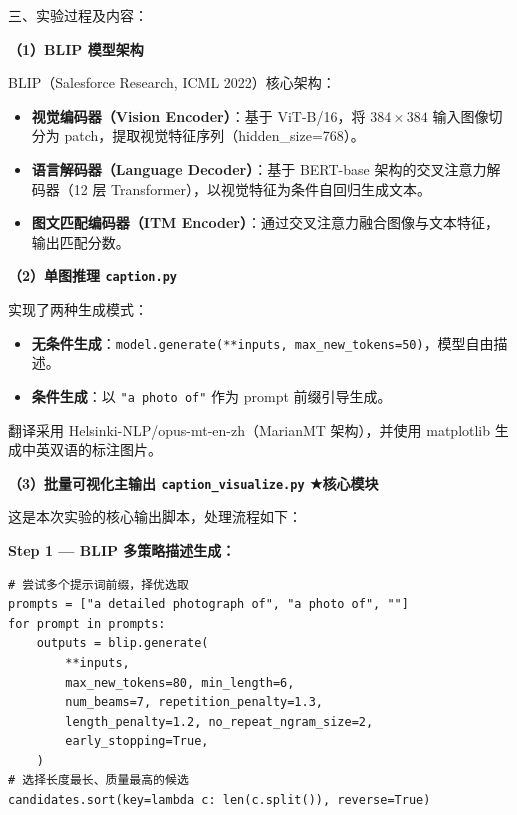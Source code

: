 \documentclass[12pt, a4paper]{article}
\begin{document}
\begin{labbox}{三、实验过程及内容：}{}

\textbf{（1）BLIP 模型架构}

BLIP（Salesforce Research, ICML 2022）核心架构：

\begin{itemize}[leftmargin=2em, itemsep=0.2em]
    \item \textbf{视觉编码器（Vision Encoder）}：基于 ViT-B/16，将 $384\times384$ 输入图像切分为 patch，提取视觉特征序列（hidden\_size=768）。
    \item \textbf{语言解码器（Language Decoder）}：基于 BERT-base 架构的交叉注意力解码器（12 层 Transformer），以视觉特征为条件自回归生成文本。
    \item \textbf{图文匹配编码器（ITM Encoder）}：通过交叉注意力融合图像与文本特征，输出匹配分数。
\end{itemize}

\vspace{0.3cm}
\textbf{（2）单图推理 \texttt{caption.py}}

实现了两种生成模式：

\begin{itemize}[leftmargin=2em, itemsep=0.2em]
    \item \textbf{无条件生成}：\texttt{model.generate(**inputs, max\_new\_tokens=50)}，模型自由描述。
    \item \textbf{条件生成}：以 \texttt{"a photo of"} 作为 prompt 前缀引导生成。
\end{itemize}

翻译采用 Helsinki-NLP/opus-mt-en-zh（MarianMT 架构），并使用 matplotlib 生成中英双语的标注图片。

\vspace{0.3cm}
\textbf{（3）批量可视化主输出 \texttt{caption\_visualize.py} ★核心模块}

这是本次实验的核心输出脚本，处理流程如下：

\noindent \textbf{Step 1 — BLIP 多策略描述生成：}

\begin{lstlisting}
# 尝试多个提示词前缀，择优选取
prompts = ["a detailed photograph of", "a photo of", ""]
for prompt in prompts:
    outputs = blip.generate(
        **inputs,
        max_new_tokens=80, min_length=6,
        num_beams=7, repetition_penalty=1.3,
        length_penalty=1.2, no_repeat_ngram_size=2,
        early_stopping=True,
    )
# 选择长度最长、质量最高的候选
candidates.sort(key=lambda c: len(c.split()), reverse=True)
\end{lstlisting}


\end{labbox}
\end{document}
